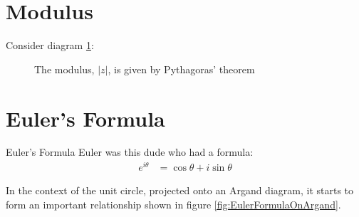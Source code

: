 \section{Modulus}
\label{sec:CP Modulus}

Consider diagram \ref{fig:modulus}:

\begin{figure}[!htb]
\begin{center}
\end{center}
\caption{The modulus, $\lvert z \rvert$, is given by Pythagoras' theorem}
\label{fig:modulus}
\end{figure}

\section{Euler's Formula}
\label{sec:CP Euler's Formula}
\begin{remember}{Euler's Formula}
Euler was this dude who had a formula:
\begin{align}
  e^{i\theta} & = \cos\theta + i\sin\theta \label{eq:eulerformula}
\end{align}
\end{remember}

\noindent In the context of the unit circle, projected onto an Argand diagram,
it starts to form an important relationship shown in figure \ref{fig:EulerFormulaOnArgand}.

